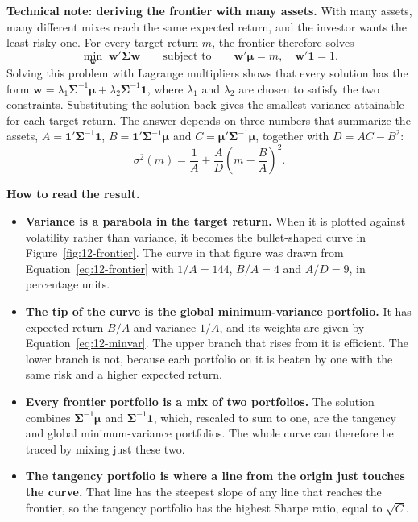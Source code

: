 \begin{technote}
\textbf{Technical note: deriving the frontier with many assets.} With many assets, many different mixes reach the same expected return, and the investor wants the least risky one. For every target return $m$, the frontier therefore solves
\begin{equation}
  \min_{\mathbf{w}} \; \mathbf{w}'\boldsymbol{\Sigma}\mathbf{w}
  \qquad \text{subject to} \qquad \mathbf{w}'\boldsymbol{\mu} = m, \quad \mathbf{w}'\mathbf{1} = 1.
  \label{eq:12-frontier-problem}
\end{equation}
Solving this problem with Lagrange multipliers shows that every solution has the form $\mathbf{w} = \lambda_1 \boldsymbol{\Sigma}^{-1}\boldsymbol{\mu} + \lambda_2 \boldsymbol{\Sigma}^{-1}\mathbf{1}$, where $\lambda_1$ and $\lambda_2$ are chosen to satisfy the two constraints. Substituting the solution back gives the smallest variance attainable for each target return. The answer depends on three numbers that summarize the assets, $A = \mathbf{1}'\boldsymbol{\Sigma}^{-1}\mathbf{1}$, $B = \mathbf{1}'\boldsymbol{\Sigma}^{-1}\boldsymbol{\mu}$ and $C = \boldsymbol{\mu}'\boldsymbol{\Sigma}^{-1}\boldsymbol{\mu}$, together with $D = AC - B^2$:
\begin{equation}
  \sigma^2(m) = \frac{1}{A} + \frac{A}{D}\left(m - \frac{B}{A}\right)^2.
  \label{eq:12-frontier}
\end{equation}

\textbf{How to read the result.}
\begin{itemize}
  \item \textbf{Variance is a parabola in the target return.} When it is plotted against volatility rather than variance, it becomes the bullet-shaped curve in Figure~\ref{fig:12-frontier}. The curve in that figure was drawn from Equation~\eqref{eq:12-frontier} with $1/A = 144$, $B/A = 4$ and $A/D = 9$, in percentage units.
  \item \textbf{The tip of the curve is the global minimum-variance portfolio.} It has expected return $B/A$ and variance $1/A$, and its weights are given by Equation~\eqref{eq:12-minvar}. The upper branch that rises from it is efficient. The lower branch is not, because each portfolio on it is beaten by one with the same risk and a higher expected return.
  \item \textbf{Every frontier portfolio is a mix of two portfolios.} The solution combines $\boldsymbol{\Sigma}^{-1}\boldsymbol{\mu}$ and $\boldsymbol{\Sigma}^{-1}\mathbf{1}$, which, rescaled to sum to one, are the tangency and global minimum-variance portfolios. The whole curve can therefore be traced by mixing just these two.
  \item \textbf{The tangency portfolio is where a line from the origin just touches the curve.} That line has the steepest slope of any line that reaches the frontier, so the tangency portfolio has the highest Sharpe ratio, equal to $\sqrt{C}$.
\end{itemize}
\end{technote}

